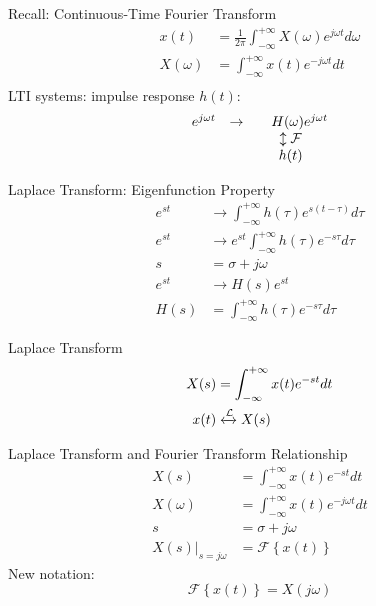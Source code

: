 \begin{frame}{Recall: Continuous-Time Fourier Transform}
    \begin{align*}
        x(t) &= \frac{1}{2\pi}\int_{-\infty}^{+\infty}X(\omega)e^{j\omega t}d\omega\\
        X(\omega) &= \int_{-\infty}^{+\infty}x(t)e^{-j\omega t}dt\\
    \end{align*}
    LTI systems: impulse response $h(t)$:
    \begin{equation*}
        \begin{matrix}
            e^{j\omega t} & \rightarrow & \quad H(\omega)e^{j\omega t} \\
            && \negthickspace\updownarrow{\mathcal{F}}\\
            && \negthickspace h(t)\\
        \end{matrix}
    \end{equation*}
\end{frame}

\begin{frame}{Laplace Transform: Eigenfunction Property}
    \begin{align*}
        e^{st} &\rightarrow \int_{-\infty}^{+\infty}h(\tau)e^{s(t-\tau)}d \tau\\
        e^{st} &\rightarrow e^{st}\int_{-\infty}^{+\infty}h(\tau)e^{-s\tau}d \tau\\
        s &= \sigma + j \omega\\
        e^{st}   &\rightarrow H(s) e^{st}\\
        H(s) &= \int_{-\infty}^{+\infty}h(\tau)e^{-s\tau}d \tau
    \end{align*}
\end{frame}


\begin{frame}{Laplace Transform}
    \begin{align*}
        X(s) &= \int_{-\infty}^{+\infty}x(t)e^{-st}dt\\
        x(t) &\xleftrightarrow{\mathcal{L}} X(s)
    \end{align*}
\end{frame}

\begin{frame}{Laplace Transform and Fourier Transform Relationship}
    \begin{align*}
        X(s) &= \int_{-\infty}^{+\infty}x(t)e^{-st}dt\\
        X(\omega) &= \int_{-\infty}^{+\infty}x(t)e^{-j\omega t}dt\\
        s &= \sigma + j\omega\\
        \left.X(s)\right|_{s=j\omega} &= \mathcal{F}\left\{ x(t)\right\}
    \end{align*}
    New notation:
    \begin{equation*}
        \mathcal{F}\left\{ x(t)\right\} = X(j\omega)
    \end{equation*}
\end{frame}

